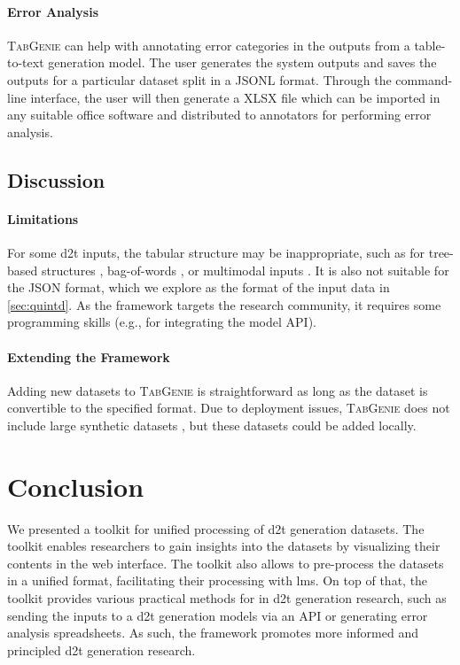 \paragraph{Error Analysis} \textsc{TabGenie} can help with annotating error categories in the outputs from a table-to-text generation model. The user generates the system outputs and saves the outputs for a particular dataset split in a JSONL format. Through the command-line interface, the user will then generate a XLSX file which can be imported in any suitable office software and distributed to annotators for performing error analysis.

\subsection{Discussion}

\paragraph{Limitations} For some \ac{d2t} inputs, the tabular structure may be inappropriate, such as for tree-based structures \cite{balakrishnan2019constrained}, bag-of-words \cite{lin2019commongen}, or multimodal inputs \cite{krishna2017visual}. It is also not suitable for the JSON format, which we explore as the format of the input data in \autoref{sec:quintd}. As the framework targets the research community, it requires some programming skills (e.g., for integrating the model API).

\paragraph{Extending the Framework} Adding new datasets to \textsc{TabGenie} is straightforward as long as the dataset is convertible to the specified format. Due to deployment issues, \textsc{TabGenie} does not include large synthetic datasets \cite{agarwalKnowledgeGraphBased2021,jinGenWikiDatasetMillion2020}, but these datasets could be added locally.


\section{Conclusion}
We presented a toolkit for unified processing of \ac{d2t} generation datasets. The toolkit enables researchers to gain insights into the datasets by visualizing their contents in the web interface. The toolkit also allows to pre-process the datasets in a unified format, facilitating their processing with \acp{lm}. On top of that, the toolkit provides various practical methods for in \ac{d2t} generation research, such as sending the inputs to a \ac{d2t} generation models via an API or generating error analysis spreadsheets. As such, the framework promotes more informed and principled \ac{d2t} generation research.